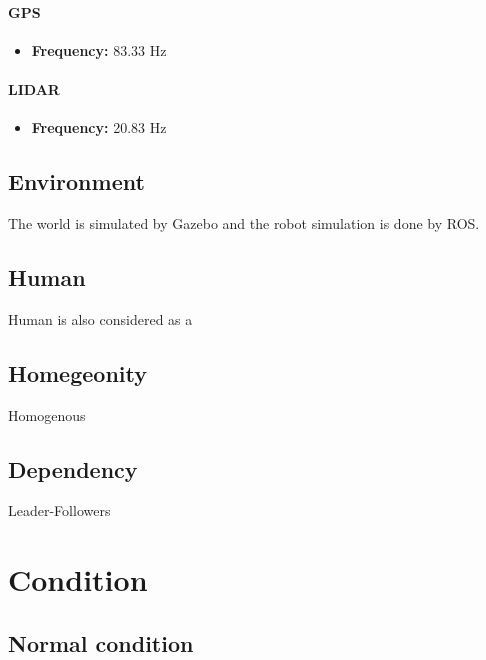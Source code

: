 \documentclass[a4paper]{article}
\begin{document}
                    \paragraph{GPS}
                        \begin{itemize}
                            \item \textbf{Frequency:} 83.33 Hz
                        \end{itemize}
                    
                    \paragraph{LIDAR}
                        \begin{itemize}
                            \item \textbf{Frequency:} 20.83 Hz
                        \end{itemize}
    
            \subsection{Environment}
                The world is simulated by Gazebo and the robot simulation is done by ROS.
            
            \subsection{Human}
                Human is also considered as a
                
            \subsection{Homegeonity}
                Homogenous
            
            \subsection{Dependency}
                Leader-Followers
            
            
    
    
    \section{Condition}
        
        \subsection{Normal condition}
\end{document}
